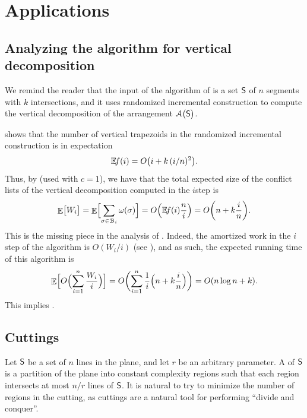 \section{Applications}

\subsection{Analyzing the \RIC algorithm for %
   vertical decomposition}

We remind the reader that the input of the algorithm of
 is a set $\mathsf{S}$ of $n$ segments with $k$
intersections, and it uses randomized incremental construction to
compute the vertical decomposition of the arrangement
$\ArrX{\bigl.\SegSet}$.

 shows that the number of vertical trapezoids in
the randomized incremental construction is in expectation
\[
\NumOfRegionsZero{i} = O\pth{ i + k\, (i/n)^2}.
\]
Thus, by
 (used with $c=1$), we have that the total expected size
of the conflict lists of the vertical decomposition computed in the
$i$\th step is
\begin{equation*}
    \Ex{\bigl. W_i}%
    =%
    \Ex{ \Bigl. \smash{\sum_{\Trap \in \ArrB_i} \WeightX{\Trap} } }%
    =%
    O \pth{ \NumOfRegionsZero{i}\frac{n}{i}}%
    =%
    O \pth{ n + k \frac{i}{n}}.
\end{equation*}

This is the missing piece in the analysis of
. Indeed, the amortized work in the $i$\th
step of the algorithm is $O(W_i/i)$ (see ),
and as such, the expected running time of this algorithm is
\begin{equation*}
    \Ex{  O \pth{\Bigl.
          \smash{\sum_{i=1}^n \frac{W_i}{i} }
       }
    } %
    =%
    O \biggl( \sum_{i=1}^n \frac{1}{i} \Bigl({ n + k \frac{i}{n}} \Bigr) \biggr)%
    =%
    O\pth{ n \log n + k }.
\end{equation*}
This implies .



\subsection{Cuttings}

Let $\mathsf{S}$ be a set of $n$ lines in the plane, and let $r$ be an
arbitrary parameter. A  of $\mathsf{S}$
is a partition of the plane into constant complexity regions such that
each region intersects at most $n/r$ lines of $\mathsf{S}$. It is natural
to try to minimize the number of regions in the cutting, as cuttings
are a natural tool for performing ``divide and conquer''.

